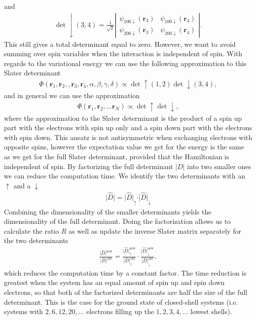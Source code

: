 \documentclass[../main.tex]{subfiles}
\begin{document}
and 
\begin{align}
    \det\downarrow(3,4)=\frac{1}{\sqrt{2}}\left| \begin{array}{cc} \psi_{100\downarrow}(\mathbf{r}_3)& \psi_{100\downarrow}(\mathbf{r}_4)\\
    \psi_{200\downarrow}(\mathbf{r}_3)& \psi_{200\downarrow}(\mathbf{r}_4) \end{array} \right|.
\end{align}
This still gives a total determinant equal to zero. However, we want to avoid summing over spin variables when the interaction is independent of spin. With regards to the variational energy we can use the following approximation to this Slater determinant 
\begin{align}
    \Phi(\mathbf{r}_1,\mathbf{r}_2,,\mathbf{r}_3,\mathbf{r}_4, \alpha,\beta,\gamma,\delta) \propto \det\uparrow(1,2)\det\downarrow(3,4), 
\end{align}
and in general we can use the approximation 
\begin{align}
    \Phi(\mathbf{r}_1,\mathbf{r}_2,\dots \mathbf{r}_N) \propto \det\uparrow \det\downarrow, 
\end{align}
where the approximation to the Slater determinant is the product of a spin up part with the electrons with spin up only and a spin down part with the electrons with spin down. This ansatz is not antisymmetric when exchanging electrons with opposite spins, however the expectation value we get for the energy is the same as we get for the full Slater determinant, provided that the Hamiltonian is independent of spin. By factorizing the full determinant $\vert\hat{D}\vert$ into two smaller ones we can reduce the computation time. We identify the two determinants with an $\uparrow$ and a $\downarrow$
\begin{align}
    \vert\hat{D}\vert = \vert\hat{D}\vert_\uparrow\cdot \vert\hat{D}\vert_\downarrow
\end{align}
Combining the dimensionality of the smaller determinants yields the dimensionality of the full determinant. Doing the factorization allows us to calculate the ratio $R$ as well as update the inverse Slater matrix separately for the two determinants 
\begin{align}
    \frac{\vert\hat{D}\vert^\mathrm{new}}{\vert\hat{D}\vert^\mathrm{old}} =
    \frac{\vert\hat{D}\vert^\mathrm{new}_\uparrow}
    {\vert\hat{D}\vert^\mathrm{old}_\uparrow}\cdot
    \frac{\vert\hat{D}\vert^\mathrm{new}_\downarrow
    }{\vert\hat{D}\vert^\mathrm{old}_\downarrow},
\end{align}
which reduces the computation time by a constant factor. The time reduction is greatest when the system has an equal amount of spin up and spin down electrons, so that both of the factorized determinants are half the size of the full determinant. This is the case for the ground state of closed-shell systems (i.e. systems with $2,6,12,20,\dots$ electrons filling up the $1,2,3,4,\dots$ lowest shells).
\end{document}

